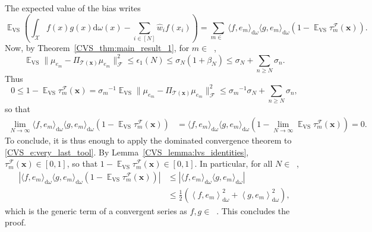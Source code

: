 \documentclass[twoside,11pt]{book}
\numberwithin{theorem}{chapter}
\numberwithin{definition}{chapter}
\numberwithin{proposition}{chapter}
\numberwithin{corollary}{chapter}
\numberwithin{example}{chapter}
\numberwithin{lemma}{chapter}
\numberwithin{assumption}{chapter}
\DeclareMathOperator{\VS}{\mathrm{VS}}
\DeclareMathOperator{\EX}{\mathbb{E}}
\DeclareMathOperator{\F}{\mathcal{F}}
\DeclareMathOperator{\X}{\mathcal{X}}
\DeclareMathOperator{\Ltwo}{\mathbb{L}_{2}(\mathrm{d} \omega)}
\DeclareMathOperator{\Ns}{\mathbb{N}^{*}}
\begin{document}
The expected value of the bias writes
\begin{equation}
\EX_{\VS} \left( \int_{\X} f(x)g(x) \mathrm{d}\omega(x) - \sum\limits_{i \in [N]} \widehat{w}_{i}f(x_{i}) \right)= \sum\limits_{m \in \Ns} \langle f,e_{m} \rangle_{\mathrm{d}\omega}\langle g,e_{m} \rangle_{\mathrm{d}\omega} \left( 1- \EX_{\VS}\tau_{m}^{\F}(\bm{x}) \right).
\label{CVS_e:very_last_tool}
\end{equation}
Now, by Theorem~\ref{CVS_thm:main_result_1}, for $m \in \Ns$,
\begin{equation}
\EX_{\VS} \|\mu_{e_{m}} - \Pi_{\mathcal{T}(\bm{x})} \mu_{e_{m}}\|_{\F}^{2} \leq \epsilon_{1}(N) \leq \sigma_{N}(1+\beta_{N}) \leq \sigma_{N} + \sum\limits_{n \geq N} \sigma_{n}.
\end{equation}
Thus
\begin{equation}
0 \leq 1-\EX_{\VS} \tau_{m}^{\F}(\bm{x}) = {\sigma_m}^{-1} \EX_{\VS} \|\mu_{e_{m}} - \Pi_{\mathcal{T}(\bm{x})} \mu_{e_{m}}\|_{\F}^{2} \leq {\sigma_{m}}^{-1}{\sigma_{N} + \sum\limits_{n \geq N} \sigma_{n}},
\end{equation}
so that
\begin{align}
\lim_{N \rightarrow \infty} \langle f,e_{m} \rangle_{\mathrm{d}\omega}\langle g,e_{m} \rangle_{\mathrm{d}\omega} \left(1- \EX_{\VS}\tau_{m}^{\F}(\bm{x}) \right) & = \langle f,e_{m} \rangle_{\mathrm{d}\omega}\langle g,e_{m} \rangle_{\mathrm{d}\omega} (1-\lim_{N \rightarrow \infty} \EX_{\VS}\tau_{m}^{\F}(\bm{x})) = 0.
\end{align}
To conclude, it is thus enough to apply the dominated convergence theorem to \eqref{CVS_e:very_last_tool}. By Lemma~\ref{CVS_lemma:lvs_identities}, $\tau_{m}^{\F}(\bm{x}) \in [0,1]$, so that $1-\EX_{\VS}\tau_{m}^{\F}(\bm{x}) \in [0,1]$.
In particular, for all $N \in \Ns$,
\begin{align}
|\langle f,e_{m} \rangle_{\mathrm{d}\omega}\langle g,e_{m} \rangle_{\mathrm{d}\omega} \left(1- \EX_{\VS}\tau_{m}^{\F}(\bm{x}) \right)| & \leq |\langle f,e_{m} \rangle_{\mathrm{d}\omega}\langle g,e_{m} \rangle_{\mathrm{d}\omega}|\\
& \leq \frac{1}{2}\left(\left\langle f,e_{m} \right\rangle_{\mathrm{d}\omega}^{2} + \left\langle g,e_{m} \right\rangle_{\mathrm{d}\omega}^{2}\right),
\end{align}
which is the generic term of a convergent series as $f,g\in\Ltwo$. This concludes the proof.
\end{document}
